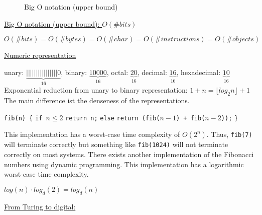 {{\begin{figure}[H]
			\caption{Big O notation (upper bound)}
			\label{fig:bigonotation}
		\end{figure}
	}
	\par{
		\noindent\underline{Big O notation (upper bound): $O(\#bits)$}
		\par{\noindent$O(\#bits) = O(\#bytes) = O(\#char) = O(\#instructions) = O(\#objects)$}
	}
	\par{
		\noindent\underline{Numeric representation}
		\par{
			\noindent
			unary: $\underbrace{||||| ||||| ||||| |0}_{16}$, binary: $\underbrace{1 0000}_{16}$, octal: $\underbrace{20}_{16}$, decimal: $\underbrace{16}_{16}$, hexadecimal: $\underbrace{10}_{16}$ \newline
			Exponential reduction from unary to binary representation: $1 + n = \lfloor log_2 n\rfloor + 1$ \newline
			The main difference ist the denseness of the representations.
		}
	}
	\par{
		\noindent
		\texttt{fib(n) \{} \newline
		\indent\texttt{if $n \le 2$} \newline
		\indent\indent\texttt{return n;} \newline
		\indent\texttt{else} \newline
		\indent\indent\texttt{return (fib($n - 1$) + fib($n - 2$));} \newline
		\texttt{\}}
	}
	\par{
		\noindent
		This implementation has a worst-case time complexity of $O(2^n)$. Thus, \texttt{fib(7)} will terminate correctly but something like \texttt{fib(1024)} will not terminate correctly on most systems. \newline
		There exists another implementation of the Fibonacci numbers using dynamic programming. This implementation has a logarithmic worst-case time complexity.
	}
	\par{\noindent $log(n) \cdot log_d(2) = log_d(n)$}
	\clearpage
	\par{
		\noindent\underline{From Turing to digital:}
		\begin{figure}[H]
			\centering
\end{figure}}}
